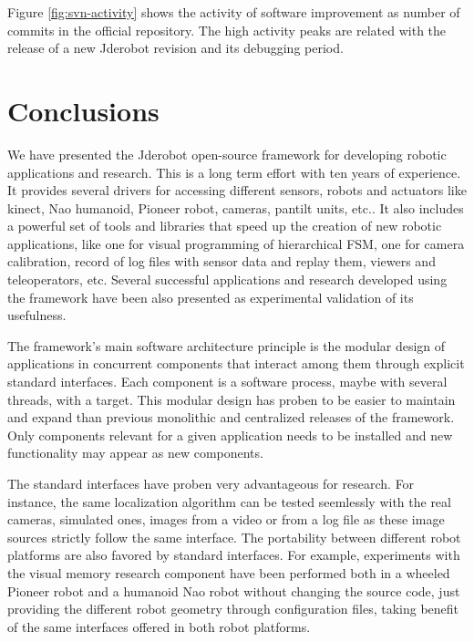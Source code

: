 \documentclass[twocolumn]{svjour3}          %
\begin{document}
Figure \ref{fig:svn-activity} shows the activity of software improvement as number of commits in the official repository. The high activity peaks are related with the release of a new Jderobot revision and its debugging period.

\section{Conclusions}

We have presented the Jderobot open-source framework for developing robotic applications and research. This is a long term effort with ten years of experience. It provides several drivers for accessing different sensors, robots and actuators like kinect, Nao humanoid, Pioneer robot, cameras, pantilt units, etc.. It also includes a powerful set of tools and libraries that speed up the creation of new robotic applications, like one for visual programming of hierarchical FSM, one for camera calibration, record of log files with sensor data and replay them, viewers and teleoperators, etc. Several successful applications and research developed using the framework have been also presented as experimental validation of its usefulness.

The framework's main software architecture principle is the modular design of applications in concurrent components that interact among them through explicit standard interfaces. Each component is a software process, maybe with several threads, with a target. This modular design has proben to be easier to maintain and expand than previous monolithic and centralized releases of the framework. Only components relevant for a given application needs to be installed and new functionality may appear as new components.

The standard interfaces have proben very advantageous for research. For instance, the same localization algorithm can be tested seemlessly with the real cameras, simulated ones, images from a video or from a log file as these image sources strictly follow the same interface. The portability between different robot platforms are also favored by standard interfaces. For example, experiments with the visual memory research component have been performed both in a wheeled Pioneer robot and a humanoid Nao robot without changing the source code, just providing the different robot geometry through configuration files, taking benefit of the same interfaces offered in both robot platforms.
\end{document}

